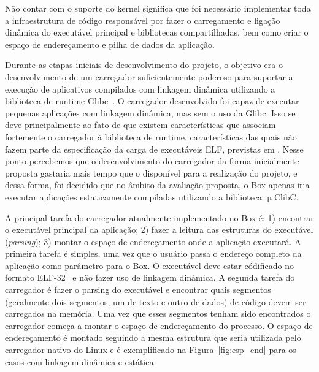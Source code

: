 \documentclass[11pt,twoside]{article}
\begin{document}
Não contar com o suporte do kernel significa que foi necessário implementar toda
a infraestrutura de código responsável por fazer o carregamento e ligação
dinâmica do executável principal e bibliotecas compartilhadas, bem como criar o
espaço de endereçamento e pilha de dados da aplicação.

Durante as etapas iniciais de desenvolvimento do projeto, o objetivo era o
desenvolvimento de um carregador suficientemente poderoso para suportar a
execução de aplicativos compilados com linkagem dinâmica utilizando a biblioteca
de runtime Glibc~\cite{glibc}. O carregador desenvolvido foi capaz de executar
pequenas aplicações com linkagem dinâmica, mas sem o uso da Glibc. Isso se deve
principalmente ao fato de que existem características que associam fortemente o
carregador à biblioteca de runtime, características das quais não fazem parte da
especificação da carga de executáveis ELF, previstas em \cite{SCO1997}.  Nesse
ponto percebemos que o desenvolvimento do carregador da forma inicialmente
proposta gastaria mais tempo que o disponível para a realização do projeto, e
dessa forma, foi decidido que no âmbito da avaliação proposta, o Box apenas iria
executar aplicações estaticamente compiladas utilizando a biblioteca
$\upmu$ClibC.

A principal tarefa do carregador atualmente implementado no Box é: 1) encontrar
o executável principal da aplicação; 2) fazer a leitura das estruturas do
executável (\emph{parsing}); 3) montar o espaço de endereçamento onde a
aplicação executará. A primeira tarefa é simples, uma vez que o usuário passa o
endereço completo da aplicação como parâmetro para o Box. O executável deve
estar códificado no formato ELF-32~\cite{SCO1997} e não fazer uso de linkagem
dinâmica. A segunda tarefa do carregador é fazer o parsing do executável e
encontrar quais segmentos (geralmente dois segmentos, um de texto e outro de
dados) de código devem ser carregados na memória. Uma vez que esses segmentos
tenham sido encontrados o carregador começa a montar o espaço de endereçamento
do processo. O espaço de endereçamento é montado seguindo a mesma estrutura que
seria utilizada pelo carregador nativo do Linux e é exemplificado na
Figura~\ref{fig:esp_end} para os casos com linkagem dinâmica e estática.
\end{document}
